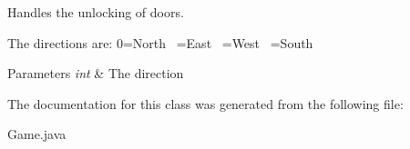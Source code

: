 Handles the unlocking of doors. 

The directions are\+: 0=North ~=East ~=West ~=South ~\newline

\begin{DoxyParams}{Parameters}
{\em int} & The direction \\
\hline
\end{DoxyParams}


The documentation for this class was generated from the following file\+:\begin{DoxyCompactItemize}
\item 
Game.\+java\end{DoxyCompactItemize}
